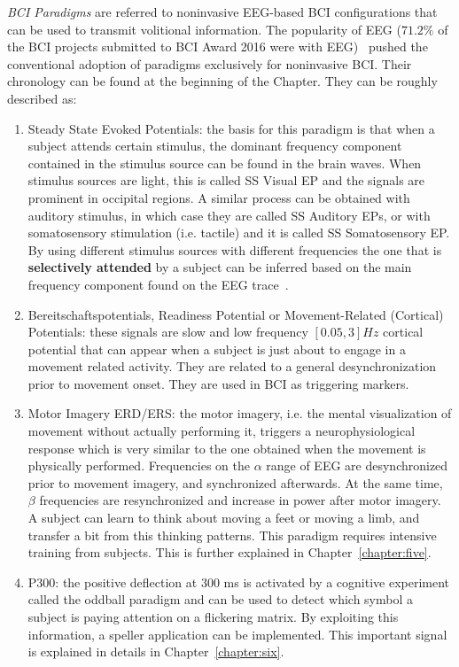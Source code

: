 \textit{BCI Paradigms} are referred to noninvasive EEG-based BCI configurations that can be used to transmit volitional information.  The popularity of EEG ($71.2\%$ of the BCI projects submitted to BCI Award 2016 were with EEG)~\cite{Guger2017} pushed the conventional adoption of paradigms exclusively for noninvasive BCI.   Their chronology can be found at the beginning of the Chapter. They can be roughly~\cite{Chaudhary2016} described as:


\begin{enumerate}
\item Steady State Evoked Potentials: the basis for this paradigm is that when a subject attends certain stimulus, the dominant frequency component contained in the stimulus source can be found in the brain waves.  When stimulus sources are light, this is called SS Visual EP and the signals are prominent in occipital regions.  A similar process can be obtained with auditory stimulus, in which case they are called SS Auditory EPs, or with somatosensory stimulation (i.e. tactile) and it is called SS Somatosensory EP.  By using different stimulus sources with different frequencies the one that is \textbf{selectively attended} by a subject can be inferred based on the main frequency component found on the EEG trace~\cite{Nam2010}.
\item Bereitschaftspotentials, Readiness Potential or Movement-Related (Cortical) Potentials: these signals are slow and low frequency $\left[0.05, 3\right] \si{Hz}$ cortical potential that can appear when a subject is just about to engage in a movement related activity.  They are related to a general desynchronization prior to movement onset.  They are used in BCI as triggering markers.
\item Motor Imagery ERD/ERS: the motor imagery, i.e. the mental visualization of movement without actually performing it, triggers a neurophysiological response which is very similar to the one obtained when the movement is physically performed. Frequencies on the $\alpha$ range of EEG are desynchronized prior to movement imagery, and synchronized afterwards. At the same time, $\beta$ frequencies are resynchronized and increase in power after motor imagery. A subject can learn to think about moving a feet or moving a limb, and transfer a bit from this thinking patterns. This paradigm requires intensive training from subjects.  This is further explained in Chapter~\ref{chapter:five}.
\item P300: the positive deflection at 300 \si{\ms} is activated by a cognitive experiment called the oddball paradigm and can be used to detect which symbol a subject is paying attention on a flickering matrix.  By exploiting this information, a speller application can be implemented. This important signal is explained in details in Chapter~\ref{chapter:six}.

\end{enumerate}
